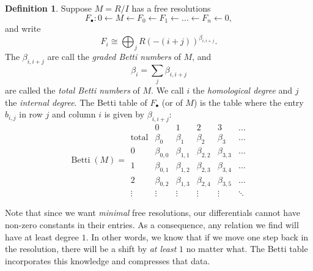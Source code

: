 \documentclass[12pt,a4paper]{article}
\DeclareMathOperator{\Betti}{Betti}
\theoremstyle{definition}
\newtheorem{definition}[theorem]{Definition}
\numberwithin{equation}{section}
\begin{document}
\begin{definition}
    Suppose $M = R/I$ has a free resolutions
    \begin{equation*}
        F_\bullet \colon 0 \leftarrow M \leftarrow F_0 \leftarrow F_1 \leftarrow \dots \leftarrow F_n \leftarrow 0,
    \end{equation*}
    and write
    \begin{equation*}
        F_i \cong \bigoplus_j R(-(i+j))^{\beta_{i,i+j}}.
    \end{equation*}
    The $\beta_{i,i+j}$ are call the \emph{graded Betti numbers} of $M$, and
    \begin{equation*}
        \beta_i = \sum_j \beta_{i,i+j}
    \end{equation*}
    are called the \emph{total Betti numbers} of $M$.
    We call $i$ the \emph{homological degree} and $j$ the \emph{internal degree}.
    The Betti table of $F_\bullet$ (or of $M$) is the table where the entry $b_{i,j}$ in row $j$ and column $i$ is given by $\beta_{i,i+j}$:
    \begin{equation*}
        \Betti(M) =
        \begin{array}{r|ccccc}
          & 0 & 1 & 2 & 3 & \dots \\
        \hline
        \text{total} & \beta_0 & \beta_1 & \beta_2 & \beta_3  & \dots \\
        \hline
         0 & \beta_{0,0} & \beta_{1,1} & \beta_{2,2} & \beta_{3,3} & \dots \\
         1 & \beta_{0,1} & \beta_{1,2} & \beta_{2,3} & \beta_{3,4} & \dots \\
         2 & \beta_{0,2} & \beta_{1,3} & \beta_{2,4} & \beta_{3,5} & \dots \\
         \vdots & \vdots & \vdots & \vdots & \vdots & \ddots
        \end{array}
    \end{equation*}
\end{definition}

Note that since we want \emph{minimal} free resolutions, our differentials cannot have non-zero constants in their entries.
As a consequence, any relation we find will have at least degree $1$.
In other words, we know that if we move one step back in the resolution, there will be a shift by \emph{at least} $1$ no matter what.
The Betti table incorporates this knowledge and compresses that data.
\end{document}
